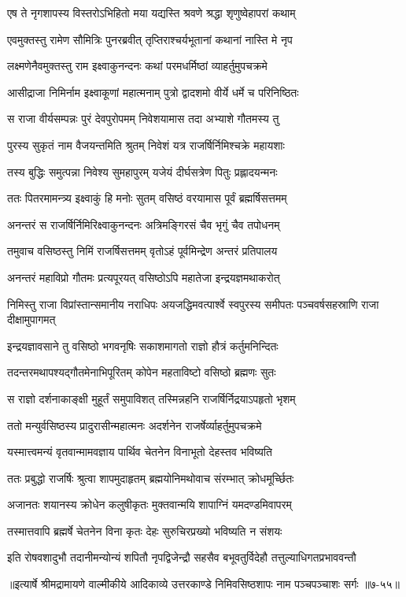 
\twolineshloka
{एष ते नृगशापस्य विस्तरोऽभिहितो मया}
{यद्यस्ति श्रवणे श्रद्धा शृणुष्वेहापरां कथाम्} %

\twolineshloka
{एवमुक्तस्तु रामेण सौमित्रिः पुनरब्रवीत्}
{तृप्तिराश्चर्यभूतानां कथानां नास्ति मे नृप} %

\twolineshloka
{लक्ष्मणेनैवमुक्तस्तु राम इक्ष्वाकुनन्दनः}
{कथां परमधर्मिष्ठां व्याहर्तुमुपचक्रमे} %

\twolineshloka
{आसीद्राजा निमिर्नाम इक्ष्वाकूणां महात्मनाम्}
{पुत्रो द्वादशमो वीर्ये धर्मे च परिनिष्ठितः} %

\twolineshloka
{स राजा वीर्यसम्पन्नः पुरं देवपुरोपमम्}
{निवेशयामास तदा अभ्याशे गौतमस्य तु} %

\twolineshloka
{पुरस्य सुकृतं नाम वैजयन्तमिति श्रुतम्}
{निवेशं यत्र राजर्षिर्निमिश्चक्रे महायशाः} %

\twolineshloka
{तस्य बुद्धिः समुत्पन्ना निवेश्य सुमहापुरम्}
{यजेयं दीर्घसत्रेण पितुः प्रह्लादयन्मनः} %

\twolineshloka
{ततः पितरमामन्त्र्य इक्ष्वाकुं हि मनोः सुतम्}
{वसिष्ठं वरयामास पूर्वं ब्रह्मर्षिसत्तमम्} %

\twolineshloka
{अनन्तरं स राजर्षिर्निमिरिक्ष्वाकुनन्दनः}
{अत्रिमङ्गिरसं चैव भृगुं चैव तपोधनम्} %

\twolineshloka
{तमुवाच वसिष्ठस्तु निमिं राजर्षिसत्तमम्}
{वृतोऽहं पूर्वमिन्द्रेण अन्तरं प्रतिपालय} %

\twolineshloka
{अनन्तरं महाविप्रो गौतमः प्रत्यपूरयत्}
{वसिष्ठोऽपि महातेजा इन्द्रयज्ञमथाकरोत्} %

\threelineshloka
{निमिस्तु राजा विप्रांस्तान्समानीय नराधिपः}
{अयजद्धिमवत्पार्श्वे स्वपुरस्य समीपतः}
{पञ्चवर्षसहस्राणि राजा दीक्षामुपागमत्} %

\twolineshloka
{इन्द्रयज्ञावसाने तु वसिष्ठो भगवनृषिः}
{सकाशमागतो राज्ञो हौत्रं कर्तुमनिन्दितः} %

\twolineshloka
{तदन्तरमथापश्यद्गौतमेनाभिपूरितम्}
{कोपेन महताविष्टो वसिष्ठो ब्रह्मणः सुतः} %

\twolineshloka
{स राज्ञो दर्शनाकाङ्क्षी मुहूर्तं समुपाविशत्}
{तस्मिन्नहनि राजर्षिर्निद्रयाऽपहृतो भृशम्} %

\twolineshloka
{ततो मन्युर्वसिष्ठस्य प्रादुरासीन्महात्मनः}
{अदर्शनेन राजर्षेर्व्याहर्तुमुपचक्रमे} %

\twolineshloka
{यस्मात्त्वमन्यं वृतवान्मामवज्ञाय पार्थिव}
{चेतनेन विनाभूतो देहस्तव भविष्यति} %

\twolineshloka
{ततः प्रबुद्धो राजर्षिः श्रुत्वा शापमुदाहृतम्}
{ब्रह्मयोनिमथोवाच संरम्भात् क्रोधमूर्च्छितः} %

\twolineshloka
{अजानतः शयानस्य क्रोधेन कलुषीकृतः}
{मुक्तवान्मयि शापाग्निं यमदण्डमिवापरम्} %

\twolineshloka
{तस्मात्तवापि ब्रह्मर्षे चेतनेन विना कृतः}
{देहः सुरुचिरप्रख्यो भविष्यति न संशयः} %

\twolineshloka
{इति रोषवशादुभौ तदानीमन्योन्यं शपितौ नृपद्विजेन्द्रौ}
{सहसैव बभूवतुर्विदेहौ तत्तुल्याधिगतप्रभाववन्तौ} %


॥इत्यार्षे श्रीमद्रामायणे वाल्मीकीये आदिकाव्ये उत्तरकाण्डे निमिवसिष्ठशापः नाम पञ्चपञ्चाशः सर्गः ॥७-५५॥
